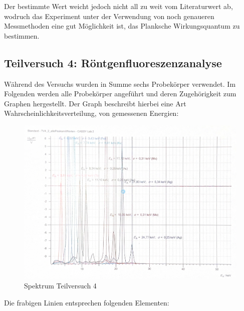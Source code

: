 \documentclass{article}
\begin{document}
Der bestimmte Wert weicht jedoch nicht all zu weit vom Literaturwert ab, wodruch das Experiment unter der Verwendung von noch genaueren Messmethoden eine gut Möglichkeit ist, das Planksche Wirkungsquantum zu bestimmen.

\newpage


\subsection{Teilversuch 4: Röntgenfluoreszenzanalyse}

Während des Versuchs wurden in Summe sechs Probekörper verwendet. Im Folgenden werden alle Probekörper angeführt und deren Zugehörigkeit zum Graphen hergestellt. Der Graph beschreibt hierbei eine Art Wahrscheinlichkeitsverteilung, von gemessenen Energien:

\begin{figure}[H]
    \centering
    \includegraphics[width=0.7\linewidth]{Abbildungen/Spektrum_Floureszrnz.png}
    \caption{Spektrum Teilversuch 4}
\end{figure}

Die frabigen Linien entsprechen folgenden Elementen:
\end{document}
